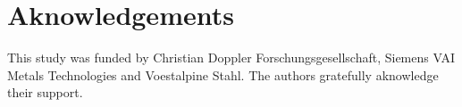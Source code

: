 \documentclass{CFD2015}
\begin{document}
\section{Aknowledgements}
This study was funded by Christian Doppler Forschungsgesellschaft, Siemens VAI Metals Technologies and Voestalpine Stahl. The authors gratefully aknowledge their support.\\


   
\end{document}
